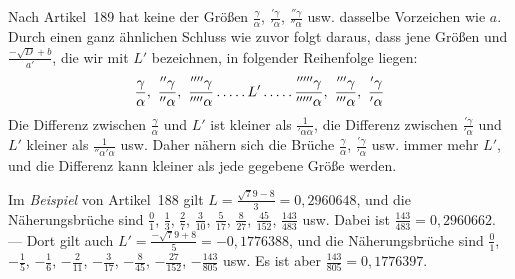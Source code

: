 Nach Artikel~189 hat keine der Größen $\frac{\gamma}{\alpha}$, $\frac{{}'\gamma}{{}'\alpha}$, $\frac{{}''\gamma}{{}''\alpha}$ usw. dasselbe Vorzeichen wie $a$. Durch einen ganz ähnlichen Schluss wie zuvor folgt daraus, dass jene Größen und $\frac{-\surd D+b}{a'}$, die wir mit $L'$ bezeichnen, in folgender Reihenfolge liegen:
\[
\frac{\gamma}{\alpha},\ \frac{{}''\gamma}{{}''\alpha},\ \frac{{}''''\gamma}{{}''''\alpha}\mathinner{\ldotp\ldotp\ldotp\ldotp\ldotp} L'\mathinner{\ldotp\ldotp\ldotp\ldotp\ldotp}\frac{{}'''''\gamma}{{}'''''\alpha},\ \frac{{}'''\gamma}{{}'''\alpha},\ \frac{{}'\gamma}{{}'\alpha}
\]
Die Differenz zwischen $\frac{\gamma}{\alpha}$ und $L'$ ist kleiner als $\frac{1}{{}'\alpha\alpha}$, die Differenz zwischen $\frac{{}'\gamma}{{}'\alpha}$ und $L'$ kleiner als $\frac{1}{{}''\alpha{}'\alpha}$ usw. Daher nähern sich die Brüche $\frac{\gamma}{\alpha}$, $\frac{{}'\gamma}{{}'\alpha}$ usw. immer mehr $L'$, und die Differenz kann kleiner als jede gegebene Größe werden.

Im \textit{Beispiel} von Artikel~188 gilt $L=\frac{\surd79-{8}}{3}=0{,}2960648$, und die Näherungsbrüche sind $\frac{0}{1}$, $\frac{1}{3}$, $\frac{2}{7}$, $\frac{3}{10}$, $\frac{5}{17}$, $\frac{8}{27}$, $\frac{45}{152}$, $\frac{143}{483}$ usw. Dabei ist $\frac{143}{483}=0{,}2960662$. --- Dort gilt auch $L'=\frac{-\surd79+{8}}{5}=-0{,}1776388$, und die Näherungsbrüche sind $\frac{0}{1}$, $-\frac{1}{5}$, $-\frac{1}{6}$, $-\frac{2}{11}$, $-\frac{3}{17}$, $-\frac{8}{45}$, $-\frac{27}{152}$, $-\frac{143}{805}$ usw. Es ist aber $\frac{143}{805}=0{,}1776397$.
